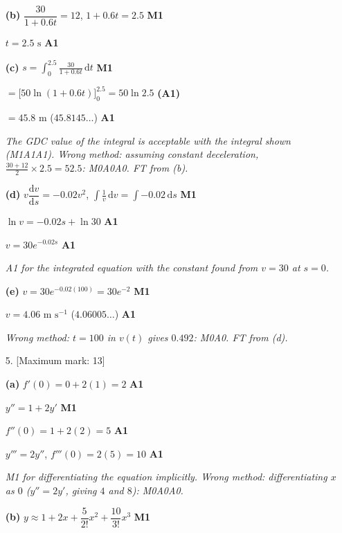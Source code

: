 \documentclass[12pt, twoside]{article}
\begin{document}
\begin{enumerate}[itemsep=0.3cm]
\textbf{(b)} $\dfrac{30}{1 + 0.6t} = 12$, \quad $1 + 0.6t = 2.5$ \hfill \textbf{M1}

$t = 2.5 \text{ s}$ \hfill \textbf{A1}

\textbf{(c)} $s = \displaystyle\int_{0}^{2.5} \frac{30}{1 + 0.6t}\,\mathrm{d}t$ \hfill \textbf{M1}

$= \Big[50\ln(1 + 0.6t)\Big]_{0}^{2.5} = 50\ln 2.5$ \hfill \textbf{(A1)}

$= 45.8 \text{ m}$ \quad ($45.8145\ldots$) \hfill \textbf{A1}

\emph{The GDC value of the integral is acceptable with the integral shown
(M1A1A1). Wrong method: assuming constant deceleration,
$\frac{30 + 12}{2} \times 2.5 = 52.5$: M0A0A0. FT from (b).}

\textbf{(d)} $v\dfrac{\mathrm{d}v}{\mathrm{d}s} = -0.02v^{2}$, \quad $\displaystyle\int \frac{1}{v}\,\mathrm{d}v = \int -0.02\,\mathrm{d}s$ \hfill \textbf{M1}

$\ln v = -0.02s + \ln 30$ \hfill \textbf{A1}

$v = 30e^{-0.02s}$ \hfill \textbf{A1}

\emph{A1 for the integrated equation with the constant found from $v = 30$
at $s = 0$.}

\textbf{(e)} $v = 30e^{-0.02(100)} = 30e^{-2}$ \hfill \textbf{M1}

$v = 4.06 \text{ m s}^{-1}$ \quad ($4.06005\ldots$) \hfill \textbf{A1}

\emph{Wrong method: $t = 100$ in $v(t)$ gives $0.492$: M0A0. FT from (d).}

\newpage

\item[5.] [Maximum mark: 13]

\textbf{(a)} $f'(0) = 0 + 2(1) = 2$ \hfill \textbf{A1}

$y'' = 1 + 2y'$ \hfill \textbf{M1}

$f''(0) = 1 + 2(2) = 5$ \hfill \textbf{A1}

$y''' = 2y''$, \quad $f'''(0) = 2(5) = 10$ \hfill \textbf{A1}

\emph{M1 for differentiating the equation implicitly. Wrong method:
differentiating $x$ as $0$ ($y'' = 2y'$, giving $4$ and $8$): M0A0A0.}

\textbf{(b)} $y \approx 1 + 2x + \dfrac{5}{2!}x^{2} + \dfrac{10}{3!}x^{3}$ \hfill \textbf{M1}


\end{enumerate}
\end{document}
